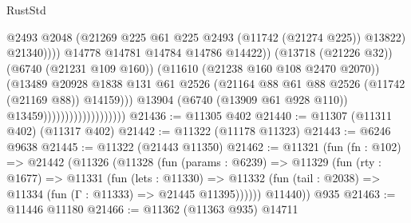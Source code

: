 \begin{lexlean}{RustStd}
\begin{coremodule}
                                                        @2493
                                                        @2048
                                                        (@21269
                                                          @225
                                                          @61
                                                          @225
                                                          @2493
                                                          (@11742 (@21274 @225))
                                                          @13822)
                                                        @21340))))
                                                @14778
                                                @14781
                                                @14784
                                                @14786
                                                @14422))
                                            (@13718 (@21226 @32))
                                            (@6740 (@21231 @109 @160))
                                            (@11610 (@21238 @160 @108 @2470 @2070))
                                            (@13489
                                              @20928
                                              @1838
                                              @131
                                              @61
                                              @2526
                                              (@21164
                                                @88
                                                @61
                                                @88
                                                @2526
                                                (@11742 (@21169 @88))
                                                @14159)))
                                          @13904
                                          (@6740 (@13909 @61 @928 @110))
                                          @13459)))))))))))))))))))
@21436 := @11305 @402
@21440 := @11307 (@11311 @402) (@11317 @402)
@21442 := @11322 (@11178 @11323)
@21443 := @6246 @9638
@21445 := @11322 (@21443 @11350)
@21462 := @11321
    (fun (fn : @102) =>
    @21442
      (@11326
        (@11328
          (fun (params : @6239) =>
          @11329
            (fun (rty : @1677) =>
            @11331
              (fun (lets : @11330) =>
              @11332 (fun (tail : @2038) => @11334 (fun (Γ : @11333) => @21445 @11395))))))
        @11440))
    @935
@21463 := @11446 @11180
@21466 := @11362 (@11363 @935) @14711

\end{coremodule}
\end{lexlean}
